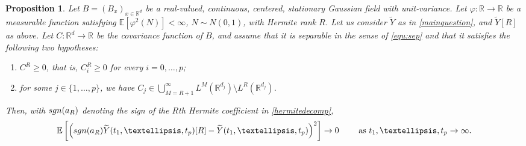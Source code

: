 \documentclass[12pt]{article}
\DeclareMathOperator{\1}{1}
\newcommand{\R}{\mathbb{R}}
\newcommand{\E}{\mathbb{E}}
\renewcommand{\L}{ L}
\newcommand{\f}{\varphi}
\theoremstyle{plain}
\newtheorem{proposition}[theorem]{Proposition}
\theoremstyle{definition}
\begin{document}
\begin{proposition}\label{prop:redP}
Let $B=(B_x)_{x\in\R^d}$ be a real-valued, continuous, centered, stationary Gaussian field with unit-variance. Let $\f:\R \rightarrow \R$ be a measurable function  satisfying $\E[\varphi^2(N)]<\infty$, $N\sim N(0,1)$, with Hermite rank $R$. Let us consider $\widetilde Y$ as in \eqref{mainquestion}, and $\widetilde Y[R]$ as above. Let $C:\R^d \rightarrow \R$ be the covariance function of $B$, and assume that it is separable in the sense of \eqref{equ:sep} and that it satisfies the following two hypotheses:
\begin{enumerate}
    \item $C^R\ge0$, that is, $C_i^R\ge0$ for every $i=0,\dots,p$;
    \item for some $j\in\{1,\ldots,p\}$, we have $C_j\in \bigcup_{M=R+1}^\infty \L^M(\R^{d_j})\setminus\L^R(\R^{d_j})$.
\end{enumerate}
    Then, with ${\rm sgn}(a_R)$ denoting the sign of the $R$th Hermite coefficient in \eqref{hermitedecomp},
    \begin{equation}
         \E\left[\left({\rm sgn}(a_R)\widetilde{Y}(t_1,\ldots,t_p)[R]-\widetilde{Y}(t_1,\ldots,t_p)\right)^2\right]\rightarrow 0 \quad \quad \text{ as } t_1,\ldots,t_p \to \infty.
    \end{equation}
\end{proposition}
\end{document}
